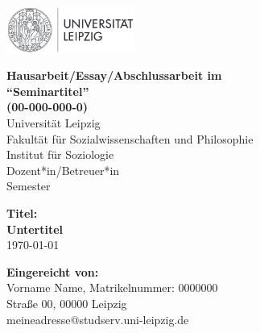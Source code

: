 \begin{titlepage}
\onehalfspacing

\begin{flushleft}
\includegraphics[width=4.2cm]{../Logo.png}
\end{flushleft}

\begin{center}
\vspace{0.5cm}
\begin{small}
\textbf{Hausarbeit/Essay/Abschlussarbeit im \\ \enquote{Seminartitel} \\
(00-000-000-0)} \\
\vspace{0.3cm}
Universität Leipzig\\
Fakultät für Sozialwissenschaften und Philosophie \\
Institut für Soziologie\\
Dozent*in/Betreuer*in\\
Semester\\
\end{small}
\vspace{3cm}
\huge \textbf{Titel: \\ Untertitel}\\
\vspace{1cm}
\large \today


\vfill



\normalsize
\onehalfspacing
\textbf{Eingereicht von:}\\
Vorname Name, Matrikelnummer: 0000000\\
Straße 00, 00000 Leipzig\\
meineadresse@studserv.uni-leipzig.de

\end{center}
\vspace{2cm}

\end{titlepage}